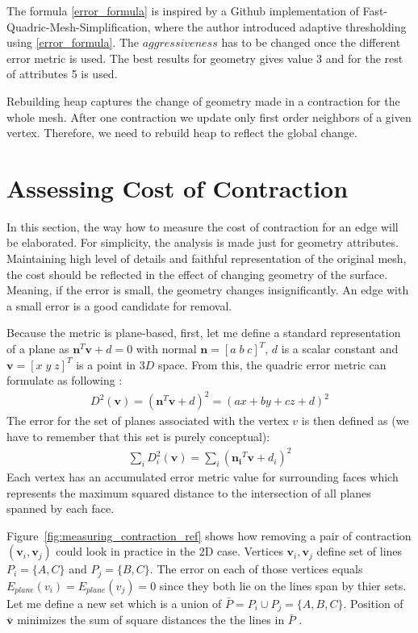 The formula \ref{error_formula} is inspired by a Github implementation of Fast-Quadric-Mesh-Simplification, where the author introduced adaptive thresholding using \ref{error_formula}. The $aggressiveness$ has to be changed once the different error metric is used. The best results for geometry gives value 3 and for the rest of attributes 5 is used.

Rebuilding heap captures the change of geometry made in a contraction for the whole mesh. After one contraction we update only first order neighbors of a given vertex. Therefore, we need to rebuild heap to reflect the global change.

\section{Assessing Cost of Contraction}
In this section, the way how to measure the cost of contraction for an edge will be elaborated. For simplicity, the analysis is made just for geometry attributes. Maintaining high level of details and faithful representation of the original mesh, the cost should be reflected in the effect of changing geometry of the surface. Meaning, if the error is small, the geometry changes insignificantly. An edge with a small error is a good candidate for removal.

Because the metric is plane-based, first, let me define a standard representation of a plane as $\mathbf{n}^T\mathbf{v}+d=0$ with normal  $\mathbf{n} = [a\;b\;c]^T$, $d$ is a scalar constant and $\mathbf{v} = [x\;y\;z]^T$ is a point in $3D$ space. From this, the quadric error metric can formulate as following \cite{garland99}:
\begin{align}
D^2(\mathbf{v}) = (\mathbf{n}^T\mathbf{v}+d)^2 = (ax + by + cz + d)^2
\label{quadric_distance}
\end{align}
The error for the set of planes associated with the vertex $v$ is then defined as (we have to remember that this set is purely conceptual):
\begin{align}
\sum_{i} D_i^2(\mathbf{v}) = \sum_{i} (\mathbf{n_i}^T\mathbf{v}+d_i)^2
\end{align}
Each vertex has an accumulated error metric value for surrounding faces which represents the maximum squared distance to the intersection of all planes spanned by each face.

Figure~\ref{fig:measuring_contraction_ref} shows how removing a pair of contraction $(\mathbf{v}_i, \mathbf{v}_j)$ could look in practice in the 2D case. Vertices $\mathbf{v}_i, \mathbf{v}_j$ define set of lines $P_i = \{A,C\}$ and $P_j = \{B, C\}$. The error on each of those vertices equals $E_{plane}(v_i) = E_{plane}(v_j) = 0$ since they both lie on the lines span by thier sets. Let me define a new set which is a union of $ \bar{P} = P_i \cup P_j = \{ A,B,C \}$. Position of $\bar{\mathbf{v}}$ minimizes the sum of square distances the the lines in $\bar{P}$ \cite{garland99}.

